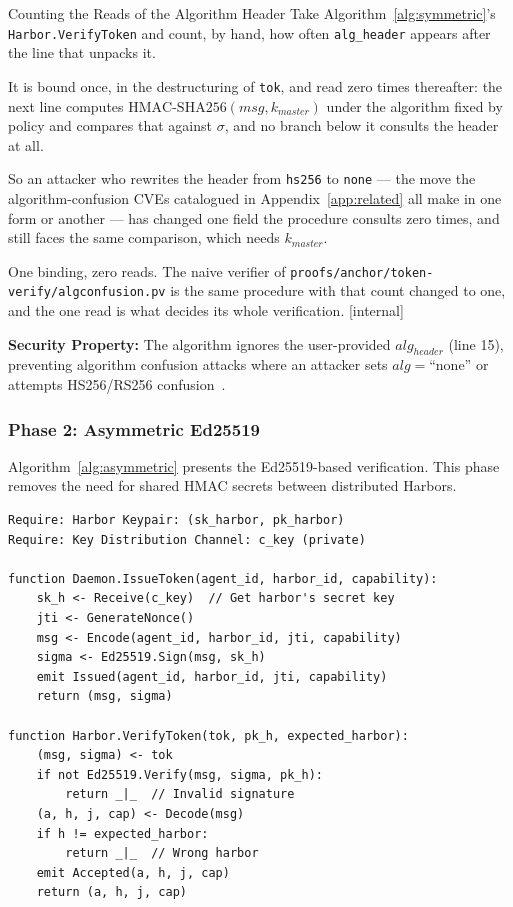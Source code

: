 \documentclass[11pt,a4paper]{article}
\theoremstyle{definition}
\begin{document}
\begin{pdexample}{Counting the Reads of the Algorithm Header}
\setlength{\parskip}{4pt plus 1pt}
Take Algorithm~\ref{alg:symmetric}'s \texttt{Harbor.VerifyToken} and count, by
hand, how often \texttt{alg\_header} appears after the line that unpacks it.

It is bound once, in the destructuring of \texttt{tok}, and read zero times
thereafter: the next line computes $\mathrm{HMAC\text{-}SHA256}(\mathit{msg},
k_{\mathit{master}})$ under the algorithm fixed by policy and compares that
against $\sigma$, and no branch below it consults the header at all.

So an
attacker who rewrites the header from \texttt{hs256} to \texttt{none} --- the
move the algorithm-confusion CVEs catalogued in Appendix~\ref{app:related} all
make in one form or another --- has changed one field the
procedure consults zero times, and still faces the same comparison, which
needs $k_{\mathit{master}}$.

One binding, zero reads. The naive verifier of
\texttt{proofs/anchor/token-verify/}\allowbreak\texttt{algconfusion.pv} is the same procedure with
that count changed to one, and the one read is what decides its whole
verification. [internal]
\end{pdexample}

\textbf{Security Property:} The algorithm ignores the user-provided $alg_{header}$ (line 15), preventing algorithm confusion attacks where an attacker sets $alg = \text{``none''}$ or attempts HS256/RS256 confusion~.

\subsubsection{Phase 2: Asymmetric Ed25519}

Algorithm~\ref{alg:asymmetric} presents the Ed25519-based verification. This phase removes the need for shared HMAC secrets between distributed Harbors.

\begin{lstlisting}[caption={Algorithm 2: Asymmetric Harbor Verification (Ed25519)},label={alg:asymmetric}]
Require: Harbor Keypair: (sk_harbor, pk_harbor)
Require: Key Distribution Channel: c_key (private)

function Daemon.IssueToken(agent_id, harbor_id, capability):
    sk_h <- Receive(c_key)  // Get harbor's secret key
    jti <- GenerateNonce()
    msg <- Encode(agent_id, harbor_id, jti, capability)
    sigma <- Ed25519.Sign(msg, sk_h)
    emit Issued(agent_id, harbor_id, jti, capability)
    return (msg, sigma)

function Harbor.VerifyToken(tok, pk_h, expected_harbor):
    (msg, sigma) <- tok
    if not Ed25519.Verify(msg, sigma, pk_h):
        return _|_  // Invalid signature
    (a, h, j, cap) <- Decode(msg)
    if h != expected_harbor:
        return _|_  // Wrong harbor
    emit Accepted(a, h, j, cap)
    return (a, h, j, cap)
\end{lstlisting}
\end{document}
